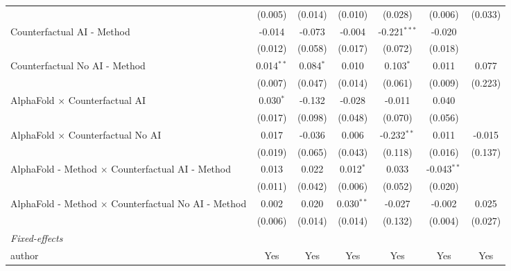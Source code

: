 \begin{tabular}{lcccccc}
                                                              & (0.005)      & (0.014)       & (0.010)      & (0.028)        & (0.006)       & (0.033)\\   
   Counterfactual AI - Method                                 & -0.014       & -0.073        & -0.004       & -0.221$^{***}$ & -0.020        &   \\   
                                                              & (0.012)      & (0.058)       & (0.017)      & (0.072)        & (0.018)       &   \\   
   Counterfactual No AI - Method                              & 0.014$^{**}$ & 0.084$^{*}$   & 0.010        & 0.103$^{*}$    & 0.011         & 0.077\\   
                                                              & (0.007)      & (0.047)       & (0.014)      & (0.061)        & (0.009)       & (0.223)\\   
   AlphaFold $\times$ Counterfactual AI                       & 0.030$^{*}$  & -0.132        & -0.028       & -0.011         & 0.040         &   \\   
                                                              & (0.017)      & (0.098)       & (0.048)      & (0.070)        & (0.056)       &   \\   
   AlphaFold $\times$ Counterfactual No AI                    & 0.017        & -0.036        & 0.006        & -0.232$^{**}$  & 0.011         & -0.015\\   
                                                              & (0.019)      & (0.065)       & (0.043)      & (0.118)        & (0.016)       & (0.137)\\   
   AlphaFold - Method $\times$ Counterfactual AI - Method     & 0.013        & 0.022         & 0.012$^{*}$  & 0.033          & -0.043$^{**}$ &   \\   
                                                              & (0.011)      & (0.042)       & (0.006)      & (0.052)        & (0.020)       &   \\   
   AlphaFold - Method $\times$ Counterfactual No AI - Method  & 0.002        & 0.020         & 0.030$^{**}$ & -0.027         & -0.002        & 0.025\\   
                                                              & (0.006)      & (0.014)       & (0.014)      & (0.132)        & (0.004)       & (0.027)\\   
   \midrule
   \emph{Fixed-effects}\\
   author                                                     & Yes          & Yes           & Yes          & Yes            & Yes           & Yes\\  

\end{tabular}
